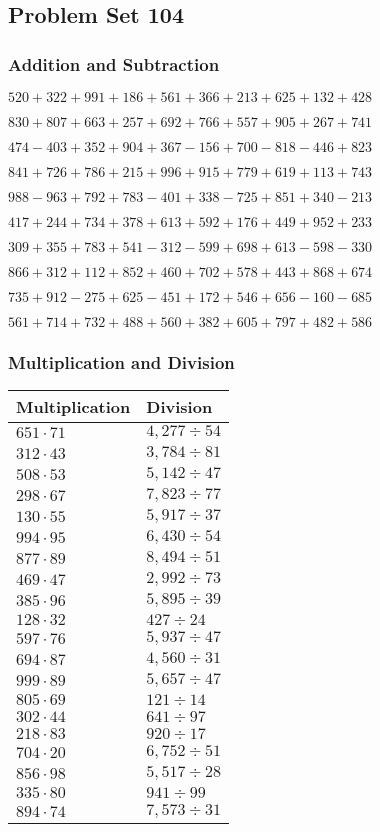 \hypertarget{problem-set-104}{%
\subsection{Problem Set 104}\label{problem-set-104}}

\hypertarget{addition-and-subtraction}{%
\subsubsection{Addition and
Subtraction}\label{addition-and-subtraction}}

\(520 +322 +991 +186 +561 +366 +213 +625 +132 +428\)

\(830 +807 +663 +257 +692 +766 +557 +905 +267 +741\)

\(474 - 403 +352 +904 +367 - 156 +700 - 818 - 446 +823\)

\(841 +726 +786 +215 +996 +915 +779 +619 +113 +743\)

\(988 - 963 +792 +783 - 401 +338 - 725 +851 +340 - 213\)

\(417 +244 +734 +378 +613 +592 +176 +449 +952 +233\)

\(309 +355 +783 +541 - 312 - 599 +698 +613 - 598 - 330\)

\(866 +312 +112 +852 +460 +702 +578 +443 +868 +674\)

\(735 +912 - 275 +625 - 451 +172 +546 +656 - 160 - 685\)

\(561 +714 +732 +488 +560 +382 +605 +797 +482 +586\)

\hypertarget{multiplication-and-division}{%
\subsubsection{Multiplication and
Division}\label{multiplication-and-division}}

\begin{longtable}[]{@{}ll@{}}
\toprule
Multiplication & Division\tabularnewline
\midrule
\endhead
\(651 \cdot 71\) & \(4,277÷54\)\tabularnewline
\(312 \cdot 43\) & \(3,784÷81\)\tabularnewline
\(508 \cdot 53\) & \(5,142÷47\)\tabularnewline
\(298 \cdot 67\) & \(7,823÷77\)\tabularnewline
\(130 \cdot 55\) & \(5,917÷37\)\tabularnewline
\(994 \cdot 95\) & \(6,430÷54\)\tabularnewline
\(877 \cdot 89\) & \(8,494÷51\)\tabularnewline
\(469 \cdot 47\) & \(2,992÷73\)\tabularnewline
\(385 \cdot 96\) & \(5,895÷39\)\tabularnewline
\(128 \cdot 32\) & \(427÷24\)\tabularnewline
\(597 \cdot 76\) & \(5,937÷47\)\tabularnewline
\(694 \cdot 87\) & \(4,560÷31\)\tabularnewline
\(999 \cdot 89\) & \(5,657÷47\)\tabularnewline
\(805 \cdot 69\) & \(121÷14\)\tabularnewline
\(302 \cdot 44\) & \(641÷97\)\tabularnewline
\(218 \cdot 83\) & \(920÷17\)\tabularnewline
\(704 \cdot 20\) & \(6,752÷51\)\tabularnewline
\(856 \cdot 98\) & \(5,517÷28\)\tabularnewline
\(335 \cdot 80\) & \(941÷99\)\tabularnewline
\(894 \cdot 74\) & \(7,573÷31\)\tabularnewline
\bottomrule
\end{longtable}

